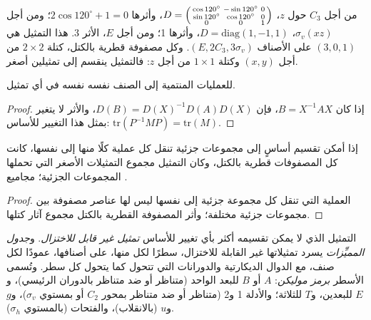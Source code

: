 \begin{example}[إحداثيات $C_{3v}$]\label{ex:b3:point-groups:xyz}
من أجل $C_3$ حول $z$، $D = \begin{psmallmatrix}\cos120^\circ & -\sin120^\circ &
0\\ \sin120^\circ & \cos120^\circ & 0\\ 0 & 0 & 1\end{psmallmatrix}$، وأثرها
$2\cos120^\circ + 1 = 0$؛ ومن أجل $\sigma_v(xz)$، $D = \mathrm{diag}(1, -1, 1)$، وأثرها
1؛ ومن أجل $E$، الأثر 3.  هذا التمثيل هي $(3, 0, 1)$ على
الأصناف $(E, 2C_3, 3\sigma_v)$. وكل مصفوفة قطرية بالكتل، كتلة
$2\times2$ من أجل $(x, y)$ وكتلة $1\times1$ من أجل $z$: فالتمثيل
ينقسم إلى تمثيلين أصغر.
\end{example}

\begin{proposition}\label{prop:b3:point-groups:class-characters}
للعمليات المنتمية إلى الصنف نفسه  نفسه في أي تمثيل.
\end{proposition}

\begin{proof}
إذا كان $B = X^{-1}AX$، فإن $D(B) = D(X)^{-1}D(A)D(X)$، والأثر لا يتغير بمثل
هذا التغيير للأساس: $\mathrm{tr}(P^{-1}MP) = \mathrm{tr}(M)$.
\end{proof}

\begin{proposition}\label{prop:b3:point-groups:direct-sum}
إذا أمكن تقسيم أساسٍ إلى مجموعات جزئية تنقل كل عملية كلًا منها إلى
نفسها، كانت كل المصفوفات قطرية بالكتل، وكان التمثيل
مجموع التمثيلات الأصغر التي تحملها المجموعات الجزئية؛ 
مجاميع .
\end{proposition}

\begin{proof}
العملية التي تنقل كل مجموعة جزئية إلى نفسها ليس لها عناصر مصفوفة
بين مجموعات جزئية مختلفة؛ وأثر المصفوفة القطرية بالكتل مجموع
آثار كتلها.
\end{proof}

\begin{definition}\label{def:b3:point-groups:irrep}
التمثيل الذي لا يمكن تقسيمه أكثر بأي تغيير للأساس
\emph{تمثيل غير قابل للاختزال}. 
و\emph{جدول المميِّزات}  يسرد
 تمثيلاتها غير القابلة للاختزال، سطرًا لكل منها، على أصنافها،
عمودًا لكل صنف، مع الدوال الديكارتية والدورانات التي تتحول
كما يتحول كل سطر. وتُسمى الأسطر \emph{برمز
موليكن}: $A$ أو $B$ للبعد الواحد (متناظر أو
ضد متناظر بالدوران الرئيسي)، و$E$ للبعدين، و$T$ للثلاثة؛
والأدلة 1 و2 (متناظر أو ضد متناظر بمحور $C_2$ أو بمستوي $\sigma_v$)، و$g$ و$u$
(بالانقلاب)، والفتحات (بالمستوي $\sigma_h$).
\end{definition}

